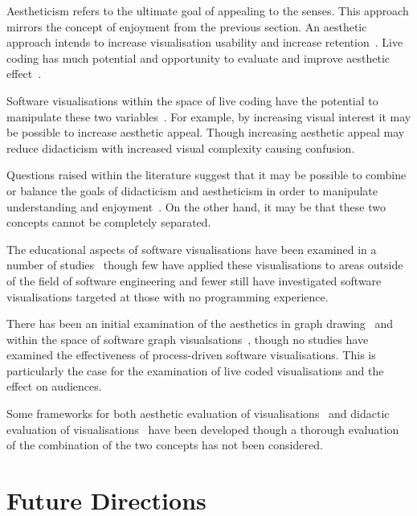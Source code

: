 Aestheticism refers to the ultimate goal of appealing to the senses. This approach mirrors the concept of enjoyment from the previous section. An aesthetic approach intends to increase visualisation usability and increase retention~\cite{Cawthon2007}. Live coding has much potential and opportunity to evaluate and improve aesthetic effect~\cite{Bell}.


Software visualisations within the space of live coding have the potential to manipulate these two variables~\cite{Iru,McLean2010a}. For example, by increasing visual interest it may be possible to increase aesthetic appeal. Though increasing aesthetic appeal may reduce didacticism with increased visual complexity causing confusion.

Questions raised within the literature suggest that it may be possible to combine or balance the goals of didacticism and aestheticism in order to manipulate understanding and enjoyment~. On the other hand, it may be that these two concepts cannot be completely separated.

The educational aspects of software visualisations have been examined in a number of studies~ though few have applied these visualisations to areas outside of the field of software engineering and fewer still have investigated software visualisations targeted at those with no programming experience.

There has been an initial examination of the aesthetics in graph drawing~ and within the space of software graph visualsations~, though no studies have examined the effectiveness of process-driven software visualisations. This is particularly the case for the examination of live coded visualisations and the effect on audiences.

Some frameworks for both aesthetic evaluation of visualisations~\cite{Cawthon2007,Purchase1996} and didactic evaluation of visualisations~\cite{VanWijk2005} have been developed though a thorough evaluation of the combination of the two concepts has not been considered.

\section{Future Directions}

